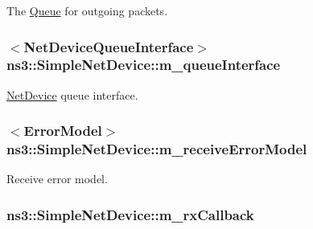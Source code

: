 The \hyperlink{classns3_1_1Queue}{Queue} for outgoing packets. 

\subsubsection[{\texorpdfstring{m\+\_\+queue\+Interface}{m_queueInterface}}]{$<${\bf Net\+Device\+Queue\+Interface}$>$ ns3\+::\+Simple\+Net\+Device\+::m\+\_\+queue\+Interface\hspace{0.3cm}{\ttfamily [private]}}\hypertarget{classns3_1_1SimpleNetDevice_a35bd6983512fe87988362fa02f6425e7}{}\label{classns3_1_1SimpleNetDevice_a35bd6983512fe87988362fa02f6425e7}


\hyperlink{classns3_1_1NetDevice}{Net\+Device} queue interface. 

\subsubsection[{\texorpdfstring{m\+\_\+receive\+Error\+Model}{m_receiveErrorModel}}]{$<${\bf Error\+Model}$>$ ns3\+::\+Simple\+Net\+Device\+::m\+\_\+receive\+Error\+Model\hspace{0.3cm}{\ttfamily [private]}}\hypertarget{classns3_1_1SimpleNetDevice_aabf566ae9e1c8351769da712e7da1177}{}\label{classns3_1_1SimpleNetDevice_aabf566ae9e1c8351769da712e7da1177}


Receive error model. 

\subsubsection[{\texorpdfstring{m\+\_\+rx\+Callback}{m_rxCallback}}]{ ns3\+::\+Simple\+Net\+Device\+::m\+\_\+rx\+Callback\hspace{0.3cm}{\ttfamily [private]}}\hypertarget{classns3_1_1SimpleNetDevice_a4e05eb44dc92b79880d7b2f9d7080afb}{}\label{classns3_1_1SimpleNetDevice_a4e05eb44dc92b79880d7b2f9d7080afb}


